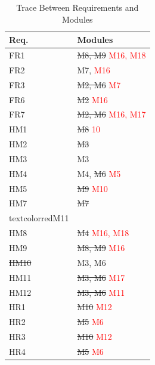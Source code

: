 \documentclass[12pt, titlepage]{article}
\begin{document}
\begin{table}[H]
\centering
\begin{tabular}{p{} p{}}
\toprule
\textbf{Req.} & \textbf{Modules}\\
\midrule
FR1 & \sout{M8, M9} \textcolor{red}{M16, M18}\\
FR2 & M7, \textcolor{red}{M16}\\
FR3 & \sout{M2, M6} \textcolor{red}{M7}\\
FR6 & \sout{M2} \textcolor{red}{M16}\\
FR7 & \sout{M2, M6} \textcolor{red}{M16, M17}\\
HM1 & \sout{M8} \textcolor{red}{10}\\
HM2 & \sout{M3} \\
HM3 & M3\\
HM4 & M4, \sout{M6} \textcolor{red}{M5}\\
HM5 & \sout{M9} \textcolor{red}{M10}\\
HM7 & \sout{M7} \\textcolor{red}{M11}\\
HM8 & \sout{M4} \textcolor{red}{M16, M18}\\
HM9 & \sout{M8, M9} \textcolor{red}{M16}\\
\sout{HM10} & M3, M6\\
HM11 & \sout{M3, M6} \textcolor{red}{M17}\\
HM12 & \sout{M3, M6} \textcolor{red}{M11}\\
HR1 & \sout{M10} \textcolor{red}{M12} \\
HR2 & \sout{M5} \textcolor{red}{M6} \\
HR3 & \sout{M10} \textcolor{red}{M12} \\
HR4 & \sout{M5} \textcolor{red}{M6}  \\
\bottomrule
\end{tabular}
\caption{Trace Between Requirements and Modules}
\label{TblRT}
\end{table}
\end{document}
